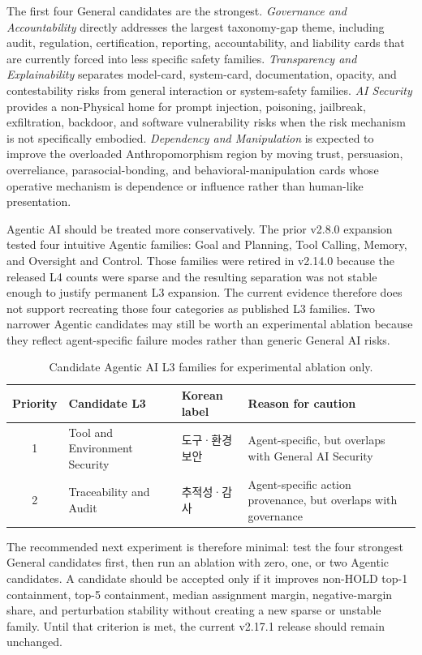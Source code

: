 \documentclass[11pt,a4paper]{article}
\newcommand{\ko}[1]{{\krfont #1}}
\begin{document}
\begin{appendices}
The first four General candidates are the strongest. \emph{Governance and
Accountability} directly addresses the largest taxonomy-gap theme, including
audit, regulation, certification, reporting, accountability, and liability
cards that are currently forced into less specific safety families.
\emph{Transparency and Explainability} separates model-card, system-card,
documentation, opacity, and contestability risks from general interaction or
system-safety families. \emph{AI Security} provides a non-Physical home for
prompt injection, poisoning, jailbreak, exfiltration, backdoor, and software
vulnerability risks when the risk mechanism is not specifically embodied.
\emph{Dependency and Manipulation} is expected to improve the overloaded
Anthropomorphism region by moving trust, persuasion, overreliance,
parasocial-bonding, and behavioral-manipulation cards whose operative
mechanism is dependence or influence rather than human-like presentation.

Agentic AI should be treated more conservatively. The prior v2.8.0 expansion
tested four intuitive Agentic families: Goal and Planning, Tool Calling,
Memory, and Oversight and Control. Those families were retired in v2.14.0
because the released L4 counts were sparse and the resulting separation was
not stable enough to justify permanent L3 expansion. The current evidence
therefore does not support recreating those four categories as published L3
families. Two narrower Agentic candidates may still be worth an experimental
ablation because they reflect agent-specific failure modes rather than generic
General AI risks.

\begin{table}[ht]
\centering
\caption{Candidate Agentic AI L3 families for experimental ablation only.}
\label{tab:agentic-candidate-l3}
\small
\setlength{\tabcolsep}{4pt}
\begin{tabularx}{\textwidth}{@{}c L{4.4cm} L{2.8cm} Y@{}}
\toprule
Priority & Candidate L3 & Korean label & Reason for caution \\
 & Tool and Environment Security & \ko{도구·환경 보안} & Agent-specific, but overlaps with General AI Security \\
2 & Traceability and Audit & \ko{추적성·감사} & Agent-specific action provenance, but overlaps with governance \\
\bottomrule
\end{tabularx}
\end{table}

The recommended next experiment is therefore minimal: test the four strongest
General candidates first, then run an ablation with zero, one, or two Agentic
candidates. A candidate should be accepted only if it improves non-HOLD top-1
containment, top-5 containment, median assignment margin, negative-margin
share, and perturbation stability without creating a new sparse or unstable
family. Until that criterion is met, the current v2.17.1 release should remain
unchanged.


\end{appendices}
\end{document}
